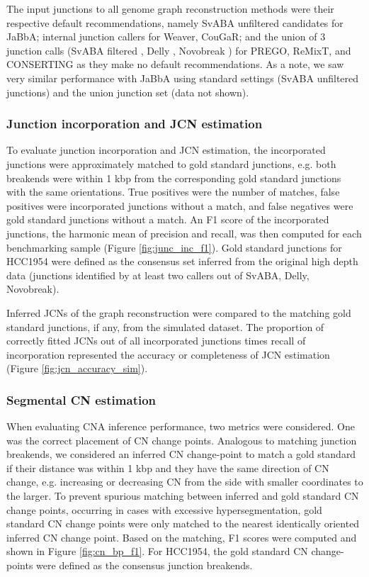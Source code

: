\documentclass[phd,tocprelim]{cornell}
\begin{document}
The input junctions to all genome graph reconstruction methods were their respective default recommendations, namely SvABA unfiltered candidates for JaBbA; internal junction callers for Weaver, CouGaR; and the union of 3 junction calls (SvABA filtered \cite{wala2018}, Delly \cite{Rausch2012-ly}, Novobreak \cite{Chong2017-gl}) for PREGO, ReMixT, and CONSERTING as they make no default recommendations.  As a note, we saw very similar performance with JaBbA using standard settings (SvABA unfiltered junctions) and the union junction set (data not shown).

\subsubsection*{Junction incorporation and JCN estimation}
To evaluate junction incorporation and JCN estimation, the incorporated junctions were approximately matched to gold standard junctions, e.g. both breakends were within 1 kbp from the corresponding gold standard junctions with the same orientations. True positives were the number of matches, false positives were incorporated junctions without a match, and false negatives were gold standard junctions without a match. An F1 score of the incorporated junctions, the harmonic mean of precision and recall, was then computed for each benchmarking sample (Figure \ref{fig:junc_inc_f1}). Gold standard junctions for HCC1954 were defined as the consensus set inferred from the original high depth data (junctions identified by at least two callers out of SvABA, Delly, Novobreak).

Inferred JCNs of the graph reconstruction were compared to the matching gold standard junctions, if any, from the simulated dataset. The proportion of correctly fitted JCNs out of all incorporated junctions times recall of incorporation represented the accuracy or completeness of JCN estimation (Figure \ref{fig:jcn_accuracy_sim}).

\subsubsection*{Segmental CN estimation}
When evaluating CNA inference performance, two metrics were considered. One was the correct placement of CN change points. Analogous to matching junction breakends, we considered an inferred CN change-point to match a gold standard if their distance was within 1 kbp and they have the same direction of CN change, e.g. increasing or decreasing CN from the side with smaller coordinates to the larger. To prevent spurious matching between inferred and gold standard CN change points, occurring in cases with excessive hypersegmentation, gold standard CN change points were only matched to the nearest identically oriented inferred CN change point.  Based on the matching, F1 scores were computed and shown in Figure \ref{fig:cn_bp_f1}. For HCC1954, the gold standard CN change-points were defined as the consensus junction breakends.
\end{document}
